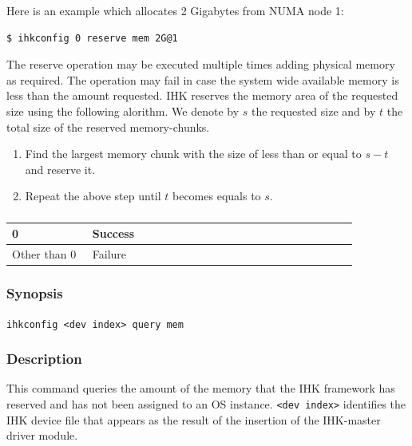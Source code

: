 \documentclass[twoside,11pt,fleqn]{book}
\begin{document}
Here is an example which allocates 2 Gigabytes from NUMA node 1:
\begin{verbatim}
$ ihkconfig 0 reserve mem 2G@1
\end{verbatim}

The reserve operation may be executed multiple times adding
physical memory as required. The operation may fail in case the system wide
available memory is less than the amount requested.
IHK reserves the memory area of the requested size using the following alorithm.
We denote by $s$ the requested size and by $t$ the total size of the reserved memory-chunks.
\begin{enumerate}
\item Find the largest memory chunk with the size of less than or equal to $s-t$ and reserve it.
\item Repeat the above step until $t$ becomes equals to $s$.
\end{enumerate}

\subsubsection*{}
\begin{table}[!h]
\footnotesize
\begin{tabular}{|p{0.20\linewidth}|p{0.66\linewidth}|} \hline
0&Success\\ \hline
Other than 0&Failure\\ \hline
\end{tabular}
\vspace{-0em}
\end{table}
\FloatBarrier

\subsubsection{}
\subsubsection*{Synopsis}{\quad} \texttt{ihkconfig <dev index> query mem}
\subsubsection*{Description}{\quad}
This command queries the amount of the memory that the IHK framework has reserved and has not been assigned to an OS instance.
\texttt{<dev index>} identifies
the IHK device file that appears as the result of the insertion of the
IHK-master driver module.
\end{document}
